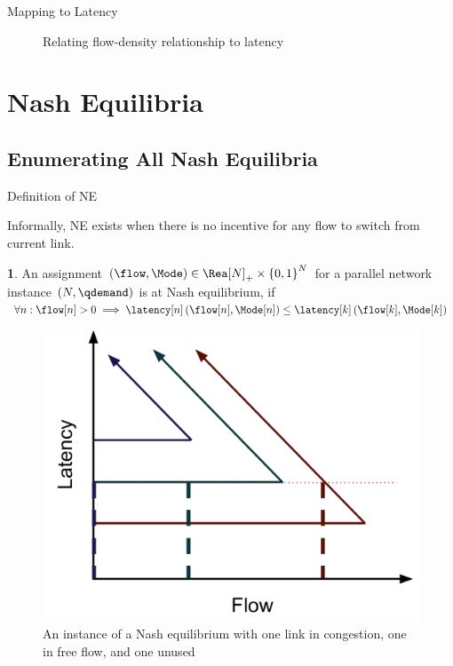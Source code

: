 \documentclass[english, smaller]{beamer}
\theoremstyle{plain}
\theoremstyle{definition}
\newtheorem{defn}[thm]{\protect\definitionname}
\theoremstyle{plain}
\theoremstyle{plain}
\providecommand{\definitionname}{Definition}
\begin{document}
\begin{frame}{Mapping to Latency}
\begin{figure}
\begin{centering}
\caption{Relating flow-density relationship to latency}
\par\end{centering}
\end{figure}
\end{frame}


\section{Nash Equilibria}

\subsection{Enumerating All Nash Equilibria}


\begin{frame}{Definition of NE}

	Informally, NE exists when there is no incentive for any flow to switch
from current link.
\begin{defn}
An assignment $\left(\flow,\Mode\right)\in\Rea[\NLinks]_{+}\times\left\{ 0,1\right\} ^{\NLinks}$
for a parallel network instance $\left(\NLinks,\qdemand\right)$ is
at Nash equilibrium, if $\forall\link:\flow[\link]>0\implies\latency[\link]\left(\flow[\link],\Mode[\link]\right)\le\latency[k]\left(\flow[k],\Mode[k]\right)$
\end{defn}
\begin{figure}
\begin{centering}
\includegraphics[scale=0.25]{../../figures/presentation/NE3link}
\par\end{centering}

\caption{An instance of a Nash equilibrium with one link in congestion, one
in free flow, and one unused}
\end{figure}



\end{frame}
\end{document}
